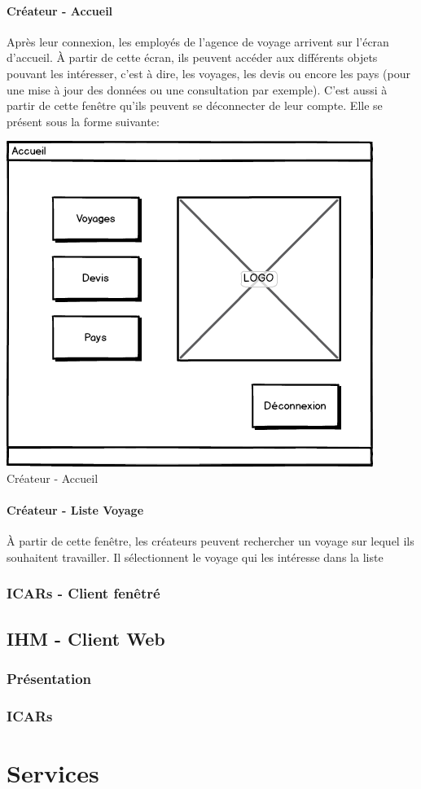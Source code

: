 \documentclass[12pt]{article}
\begin{document}
\paragraph{Créateur - Accueil}
Après leur connexion, les employés de l'agence de voyage arrivent sur l'écran d'accueil. À	partir de cette écran, ils peuvent accéder aux différents objets pouvant les intéresser, c'est à dire, les voyages, les devis ou encore les pays (pour une mise à jour des données ou une consultation par exemple). C'est aussi à partir de cette fenêtre qu'ils peuvent se déconnecter de leur compte. Elle se présent sous la forme suivante:
\begin{center}
\includegraphics[scale = 0.6]{../Conception_graphique/png_Pour_CR/Createur-10-Accueil.png}
\newline
Créateur - Accueil
\label{fig:Cr-Accueil}
\end{center}

\paragraph{Créateur - Liste Voyage}
À partir de cette fenêtre, les créateurs peuvent rechercher un voyage sur lequel ils souhaitent travailler. Il sélectionnent le voyage qui les intéresse dans la liste 

\subsubsection{ICARs - Client fenêtré}

\subsection{IHM - Client Web}
\subsubsection{Présentation}
\subsubsection{ICARs}

\section{Services}
\end{document}
